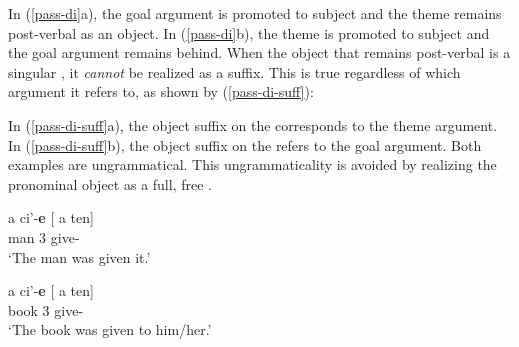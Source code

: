 \documentclass[output=paper,
modfonts
]{langscibook}
\begin{document}
\noindent In (\ref{pass-di}a), the goal argument is promoted to subject and the theme remains post-verbal as an object. In (\ref{pass-di}b), the theme is promoted to subject and the goal argument remains behind. When the object that remains post-verbal is a singular , it \textit{cannot} be realized as a suffix. This is true regardless of which argument it refers to, as shown by (\ref{pass-di-suff}):

\begin{exe}
\ex \label{pass-di-suff}
\begin{xlista}

\end{xlista}
\end{exe}

\noindent In (\ref{pass-di-suff}a), the object suffix on the  corresponds to the theme argument. In (\ref{pass-di-suff}b), the object suffix on the  refers to the goal argument. Both examples are ungrammatical. This ungrammaticality is avoided by realizing the pronominal object as a full, free . 

\begin{exe}
\ex \label{pass-di-pro}
\begin{xlista}
\ex {} a ci'-\textbf{e}  [ a ten] \\
{} man \Det{} 3 give-\Pass{} {} \Obj{} \Tsg{} \\
\glt `The man was given it.'

\ex \gll [\xp{DP} atere le] a ci'-\textbf{e} [ a ten] \\
{} book \Det{} 3 give-\Pass{} {} \Obj{} \Tsg{} \\
\glt `The book was given to him/her.' 
\end{xlista}
\end{exe}
\end{document}
